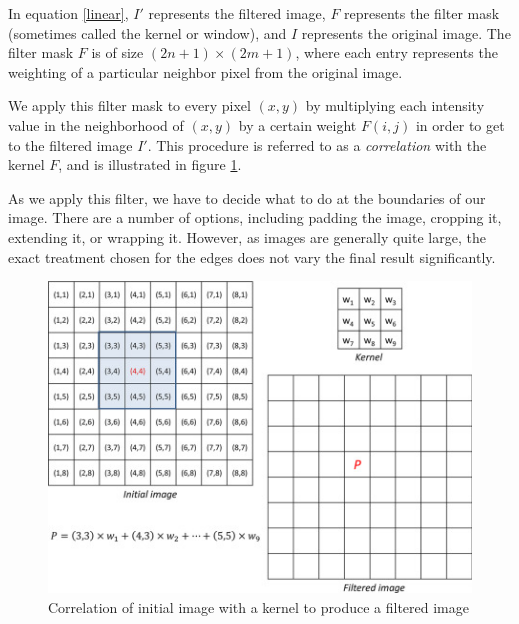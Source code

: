 \documentclass[twoside]{article}
\begin{document}
In equation \ref{linear}, $I'$ represents the filtered image, $F$ represents the filter mask (sometimes called the kernel or window), and $I$ represents the original image. The filter mask $F$ is of size $(2n+1)\times(2m+1)$, where each entry represents the weighting of a particular neighbor pixel from the original image.

We apply this filter mask to every pixel $(x,y)$ by multiplying each intensity value in the neighborhood of $(x,y)$ by a certain weight $F(i,j)$ in order to get to the filtered image $I'$. This procedure is referred to as a \textit{correlation} with the kernel $F$, and is illustrated in figure \ref{correlation}. 

As we apply this filter, we have to decide what to do at the boundaries of our image. There are a number of options, including padding the image, cropping it, extending it, or wrapping it. However, as images are generally quite large, the exact treatment chosen for the edges does not vary the final result significantly.

\begin{figure}[h]
  \centering
  \includegraphics[scale=.8]{filter.jpg}
    \caption{Correlation of initial image with a kernel to produce a filtered image}
    \label{correlation}
\end{figure}
\end{document}

